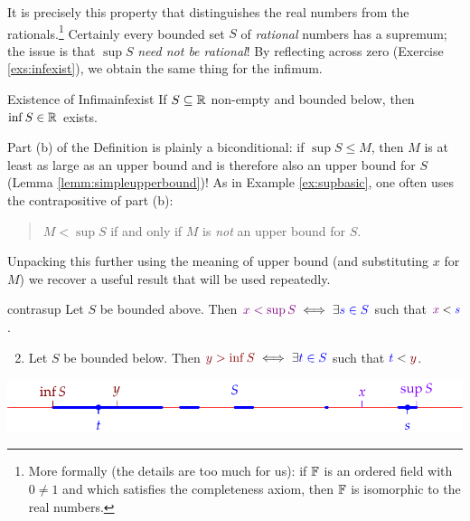 It is precisely this property that distinguishes the real numbers from the rationals.\footnote{%
	\label{fn:syntheticR}More formally (the details are too much for us): if $\mathbb{F}$ is an ordered field with $0\neq 1$ and which satisfies the completeness axiom, then $\mathbb{F}$ is isomorphic to the real numbers.%
} Certainly every bounded set $S$ of \emph{rational} numbers has a supremum; the issue is that $\sup S$ \emph{need not be rational}!\smallbreak
By reflecting across zero (Exercise \ref{exs:infexist}), we obtain the same thing for the infimum.

\begin{thm}{Existence of Infima}{infexist}
	If $S\subseteq\mathbb{R}$ non-empty and bounded below, then $\inf S\in\mathbb{R}$ exists.
\end{thm}


Part (b) of the Definition is plainly a biconditional: if $\sup S\le M$, then $M$ is at least as large as an upper bound and is therefore also an upper bound for $S$ (Lemma \ref{lemm:simpleupperbound})! As in Example \ref{ex:supbasic}, one often uses the contrapositive of part (b):

\begin{quote}
	$M<\sup S$ if and only if $M$ is \emph{not} an upper bound for $S$.
\end{quote}

Unpacking this further using the meaning of upper bound (and substituting $x$ for $M$) we recover a useful result that will be used repeatedly.

\begin{lemm}{}{contrasup}
	\exstart Let $S$ be bounded above. Then $\textcolor{Purple}{x<\sup S}\iff\exists \textcolor{blue}{s\in S}$ such that $\textcolor{Purple}{x}<\textcolor{blue}{s}$.
	\begin{enumerate}\setcounter{enumi}{1}
	  \item Let $S$ be bounded below. Then $\textcolor{Red4}{y>\inf S}\iff \exists \textcolor{blue}{t\in S}$ such that $\textcolor{blue}{t}<\textcolor{Red4}{y}$.
	\end{enumerate}
	\begin{center}
		\includegraphics{supinf4}
	\end{center}
\end{lemm}









